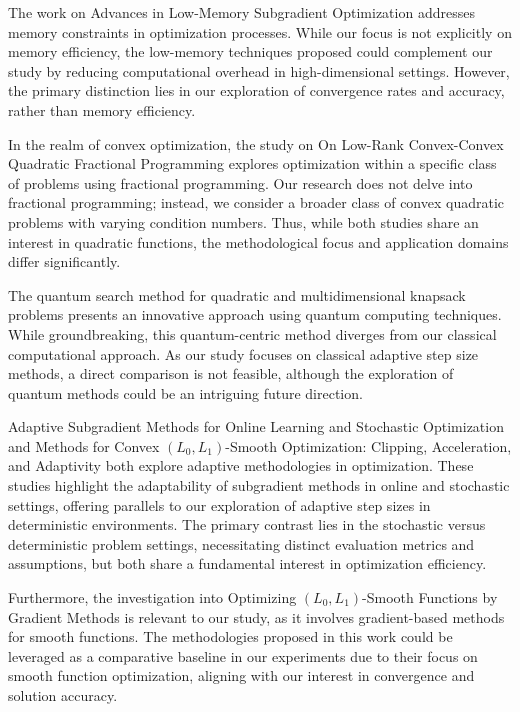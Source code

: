 \documentclass[11pt]{article}
\begin{document}
The work on Advances in Low-Memory Subgradient Optimization \cite{Dvurechensky2019AdvancesIL} addresses memory constraints in optimization processes. While our focus is not explicitly on memory efficiency, the low-memory techniques proposed could complement our study by reducing computational overhead in high-dimensional settings. However, the primary distinction lies in our exploration of convergence rates and accuracy, rather than memory efficiency.

In the realm of convex optimization, the study on On Low-Rank Convex-Convex Quadratic Fractional Programming  explores optimization within a specific class of problems using fractional programming. Our research does not delve into fractional programming; instead, we consider a broader class of convex quadratic problems with varying condition numbers. Thus, while both studies share an interest in quadratic functions, the methodological focus and application domains differ significantly.

The quantum search method for quadratic and multidimensional knapsack problems  presents an innovative approach using quantum computing techniques. While groundbreaking, this quantum-centric method diverges from our classical computational approach. As our study focuses on classical adaptive step size methods, a direct comparison is not feasible, although the exploration of quantum methods could be an intriguing future direction.

Adaptive Subgradient Methods for Online Learning and Stochastic Optimization \cite{Duchi2011AdaptiveSM} and Methods for Convex \((L_0,L_1)\)-Smooth Optimization: Clipping, Acceleration, and Adaptivity  both explore adaptive methodologies in optimization. These studies highlight the adaptability of subgradient methods in online and stochastic settings, offering parallels to our exploration of adaptive step sizes in deterministic environments. The primary contrast lies in the stochastic versus deterministic problem settings, necessitating distinct evaluation metrics and assumptions, but both share a fundamental interest in optimization efficiency.

Furthermore, the investigation into Optimizing \((L_0, L_1)\)-Smooth Functions by Gradient Methods \cite{Vankov2024OptimizingL} is relevant to our study, as it involves gradient-based methods for smooth functions. The methodologies proposed in this work could be leveraged as a comparative baseline in our experiments due to their focus on smooth function optimization, aligning with our interest in convergence and solution accuracy.
\end{document}
